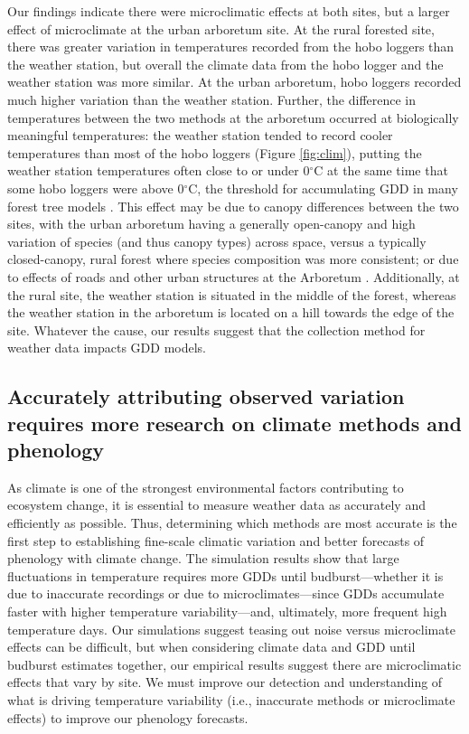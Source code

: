 \documentclass{article}\usepackage[]{graphicx}\usepackage[]{color}
\begin{document}
Our findings indicate there were microclimatic effects at both sites, but a larger effect of microclimate at the urban arboretum site. At the rural forested site, there was greater variation in temperatures recorded from the hobo loggers than the weather station, but overall the climate data from the hobo logger and the weather station was more similar. At the urban arboretum, hobo loggers recorded much higher variation than the weather station. Further, the difference in temperatures between the two methods at the arboretum occurred at biologically meaningful temperatures: the weather station tended to record cooler temperatures than most of the hobo loggers (Figure \ref{fig:clim}), putting the weather station temperatures often close to or under 0$^{\circ}$C at the same time that some hobo loggers were above 0$^{\circ}$C, the threshold for accumulating GDD in many forest tree models \citep{Man2010}. This effect may be due to canopy differences between the two sites, with the urban arboretum having a generally open-canopy and high variation of species (and thus canopy types) across space, versus a typically closed-canopy, rural forest where species composition was more consistent; or due to effects of roads and other urban structures at the Arboretum \citep{Erell2012,Dimoudi2013,Stabler2005}. Additionally, at the rural site, the weather station is situated in the middle of the forest, whereas the weather station in the arboretum is located on a hill towards the edge of the site. Whatever the cause, our results suggest that the collection method for weather data impacts GDD models.

\subsection*{Accurately attributing observed variation requires more research on climate methods and phenology} 
As climate is one of the strongest environmental factors contributing to ecosystem change, it is essential to measure weather data as accurately and efficiently as possible. Thus, determining which methods are most accurate is the first step to establishing fine-scale climatic variation and better forecasts of phenology with climate change. The simulation results show that large fluctuations in temperature requires more GDDs until budburst---whether it is due to inaccurate recordings or due to microclimates---since GDDs accumulate faster with higher temperature variability---and, ultimately, more frequent high temperature days. Our simulations suggest teasing out noise versus microclimate effects can be difficult, but when considering climate data and GDD until budburst estimates together, our empirical results suggest there are microclimatic effects that vary by site. We must improve our detection and understanding of what is driving temperature variability (i.e., inaccurate methods or microclimate effects) to improve our phenology forecasts.
  
\end{document}
